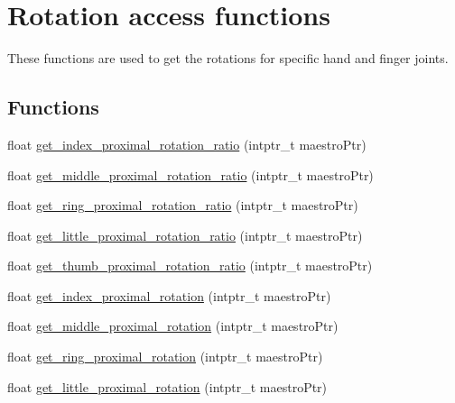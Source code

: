 \hypertarget{group__rotation_access}{}\section{Rotation access functions}
\label{group__rotation_access}


These functions are used to get the rotations for specific hand and finger joints.  


\subsection*{Functions}
\begin{DoxyCompactItemize}
\item 
float \hyperlink{group__rotation_access_ga2b6d18c3684d7f0759ebae5201edc666}{get\+\_\+index\+\_\+proximal\+\_\+rotation\+\_\+ratio} (intptr\+\_\+t maestro\+Ptr)
\item 
float \hyperlink{group__rotation_access_gaf8bed7222cb6414313c279237f4233d7}{get\+\_\+middle\+\_\+proximal\+\_\+rotation\+\_\+ratio} (intptr\+\_\+t maestro\+Ptr)
\item 
float \hyperlink{group__rotation_access_gaf6dfb65e74ed572e79a082d42e53157f}{get\+\_\+ring\+\_\+proximal\+\_\+rotation\+\_\+ratio} (intptr\+\_\+t maestro\+Ptr)
\item 
float \hyperlink{group__rotation_access_gad356c1f99c4dbb4631a28f0cf8e654b5}{get\+\_\+little\+\_\+proximal\+\_\+rotation\+\_\+ratio} (intptr\+\_\+t maestro\+Ptr)
\item 
float \hyperlink{group__rotation_access_ga6757e84fae5850e95bf380b534a1dd14}{get\+\_\+thumb\+\_\+proximal\+\_\+rotation\+\_\+ratio} (intptr\+\_\+t maestro\+Ptr)
\item 
float \hyperlink{group__rotation_access_ga7d2da9a343911275b4343c2904c0f92a}{get\+\_\+index\+\_\+proximal\+\_\+rotation} (intptr\+\_\+t maestro\+Ptr)
\item 
float \hyperlink{group__rotation_access_gab9cbb79e5f1b47bd20c079d636b825f0}{get\+\_\+middle\+\_\+proximal\+\_\+rotation} (intptr\+\_\+t maestro\+Ptr)
\item 
float \hyperlink{group__rotation_access_ga2941894deaa99df80b74f33c824bbb07}{get\+\_\+ring\+\_\+proximal\+\_\+rotation} (intptr\+\_\+t maestro\+Ptr)
\item 
float \hyperlink{group__rotation_access_ga92c96531688ae5be50890e7883eccd05}{get\+\_\+little\+\_\+proximal\+\_\+rotation} (intptr\+\_\+t maestro\+Ptr)
\item 

\end{DoxyCompactItemize}
